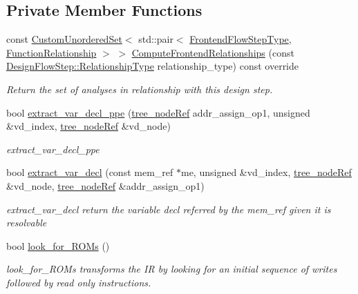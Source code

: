 \subsection*{Private Member Functions}
\begin{DoxyCompactItemize}
\item 
const \hyperlink{classCustomUnorderedSet}{Custom\+Unordered\+Set}$<$ std\+::pair$<$ \hyperlink{frontend__flow__step_8hpp_afeb3716c693d2b2e4ed3e6d04c3b63bb}{Frontend\+Flow\+Step\+Type}, \hyperlink{classFrontendFlowStep_af7cf30f2023e5b99e637dc2058289ab0}{Function\+Relationship} $>$ $>$ \hyperlink{classrebuild__initialization2_a43438dd8a7fb5bca487cd7c234c6342a}{Compute\+Frontend\+Relationships} (const \hyperlink{classDesignFlowStep_a723a3baf19ff2ceb77bc13e099d0b1b7}{Design\+Flow\+Step\+::\+Relationship\+Type} relationship\+\_\+type) const override
\begin{DoxyCompactList}\small\item\em Return the set of analyses in relationship with this design step. \end{DoxyCompactList}\item 
bool \hyperlink{classrebuild__initialization2_ae04cac56986ff94ce40cb7e9279e0628}{extract\+\_\+var\+\_\+decl\+\_\+ppe} (\hyperlink{tree__node_8hpp_a6ee377554d1c4871ad66a337eaa67fd5}{tree\+\_\+node\+Ref} addr\+\_\+assign\+\_\+op1, unsigned \&vd\+\_\+index, \hyperlink{tree__node_8hpp_a6ee377554d1c4871ad66a337eaa67fd5}{tree\+\_\+node\+Ref} \&vd\+\_\+node)
\begin{DoxyCompactList}\small\item\em extract\+\_\+var\+\_\+decl\+\_\+ppe \end{DoxyCompactList}\item 
bool \hyperlink{classrebuild__initialization2_a0be02ce2244d4da31a1bc1856ed218ca}{extract\+\_\+var\+\_\+decl} (const mem\+\_\+ref $\ast$me, unsigned \&vd\+\_\+index, \hyperlink{tree__node_8hpp_a6ee377554d1c4871ad66a337eaa67fd5}{tree\+\_\+node\+Ref} \&vd\+\_\+node, \hyperlink{tree__node_8hpp_a6ee377554d1c4871ad66a337eaa67fd5}{tree\+\_\+node\+Ref} \&addr\+\_\+assign\+\_\+op1)
\begin{DoxyCompactList}\small\item\em extract\+\_\+var\+\_\+decl return the variable decl referred by the mem\+\_\+ref given it is resolvable \end{DoxyCompactList}\item 
bool \hyperlink{classrebuild__initialization2_a677aa83a6003323f11929da9609b7344}{look\+\_\+for\+\_\+\+R\+O\+Ms} ()
\begin{DoxyCompactList}\small\item\em look\+\_\+for\+\_\+\+R\+O\+Ms transforms the IR by looking for an initial sequence of writes followed by read only instructions. \end{DoxyCompactList}\end{DoxyCompactItemize}
